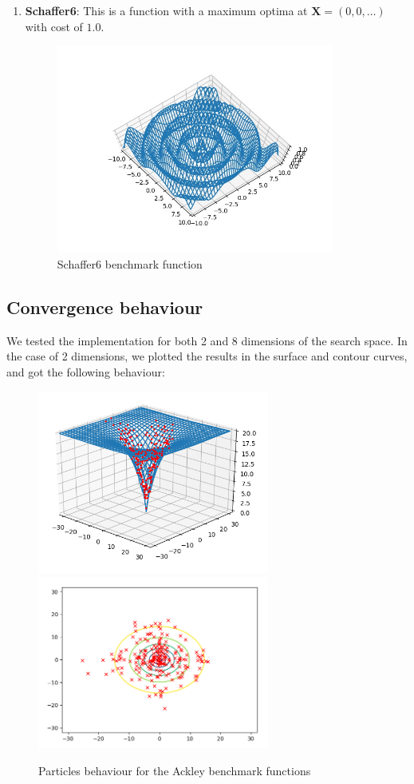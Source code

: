 \documentclass[journal,onecolumn]{IEEEtran}
\begin{document}
\begin{enumerate}
    \item \textbf{Schaffer6}: This is a function with a maximum optima at $\textbf{X} = (0,0,\hdots)$ with cost of $1.0$.

    \begin{figure}[H]
    \centering
    \captionsetup{justification=centering}
    \includegraphics[width=3.6in]{_img/img_bmfunction_schafferfcn6.jpeg}
    \caption{Schaffer6 benchmark function}
    \end{figure}

\end{enumerate}

\subsection{ \textbf{Convergence behaviour} }

We tested the implementation for both 2 and 8 dimensions of the search space. In the case of 2 dimensions, we plotted the results in the surface and contour curves, and got the following behaviour:
\begin{figure}[H]
\centering
\captionsetup{justification=centering}
\includegraphics[width=3.0in]{_img/img_PSO_test_2d_ackley_3dview.png}
\includegraphics[width=3.0in]{_img/img_PSO_test_2d_ackley_contours.png}
\caption{Particles behaviour for the Ackley benchmark functions}
\end{figure}
\end{document}
